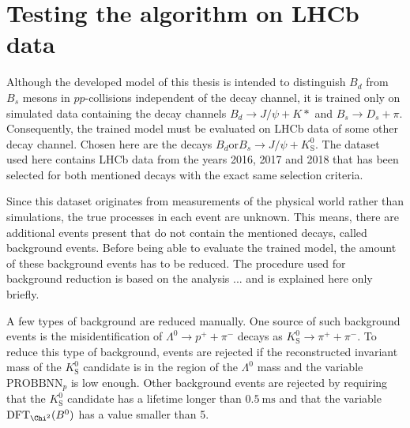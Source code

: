 \section{Testing the algorithm on LHCb data}



Although the developed model of this thesis is intended to distinguish $B_d$ from $B_s$ mesons in $pp$-collisions independent of the decay channel, it is trained only on simulated data containing the decay channels $B_d \rightarrow J/\psi + K*$ and $B_s \rightarrow D_s + \pi$.
Consequently, the trained model must be evaluated on LHCb data of some other decay channel.
Chosen here are the decays $B_d \text{or} B_s \rightarrow J/\psi + K^0_\text{S}$.
The dataset used here contains LHCb data from the years 2016, 2017 and 2018 that has been selected for both mentioned decays with the exact same selection criteria.

Since this dataset originates from measurements of the physical world rather than simulations, the true processes in each event are unknown. This means, there are additional events present that do not contain the mentioned decays, called background events.
Before being able to evaluate the trained model, the amount of these background events has to be reduced.
The procedure used for background reduction is based on the analysis ... and is explained here only briefly.

A few types of background are reduced manually.
One source of such background events is the misidentification of $\Lambda^0 \rightarrow p^+ + \pi^-$ decays as $K^0_\text{S} \rightarrow \pi^+ + \pi^-$.
To reduce this type of background, events are rejected if the reconstructed invariant mass of the $K^0_\text{S}$ candidate is in the region of the $\Lambda^0$ mass and the variable $\text{PROBBNN}_p$ is low enough.
Other background events are rejected by requiring that the $K^0_\text{S}$ candidate has a lifetime longer than $\qty{0.5}{\ms}$ and that the variable $\text{DFT}_{\Chi^2}(B^0)$ has a value smaller than 5.

